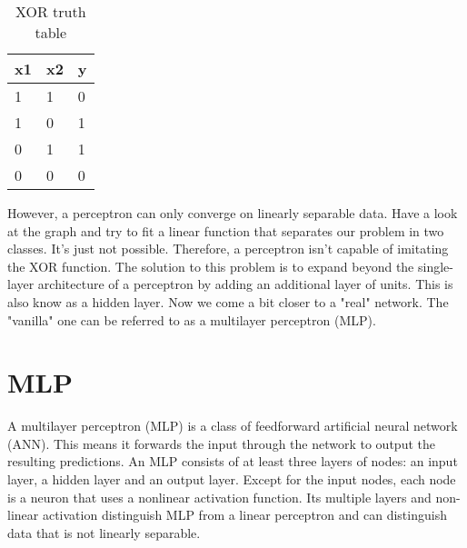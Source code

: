 %
\vspace{0.5cm}
\begin{table}[h!]
	\begin{center}
		\small\sffamily\renewcommand{\arraystretch}{0.9}
		\begin{tabular}{p{0.5cm}p{0.5cm}p{0.5cm}}
			x1 & x2 & y \\
			\midrule
			1 & 1 & 0 \\
			1 & 0 & 1 \\
			0 & 1 & 1 \\
			0 & 0 & 0 \\
		\end{tabular}
	\end{center}
	\caption[XOR truth table]{XOR truth table}
	\label{tab:event3}
\end{table}

However, a perceptron can only converge on linearly separable data. Have a look at the graph and try to fit a linear function that separates our problem in two classes. It's just not possible. Therefore, a perceptron isn’t capable of imitating the XOR function. The solution to this problem is to expand beyond the single-layer architecture of a perceptron by adding an additional layer of units. This is also know as a hidden layer. Now we come a bit closer to a "real" network. The "vanilla" one can be referred to as a multilayer perceptron (MLP).
%
%
\section{MLP}	
%
%
A multilayer perceptron (MLP) is a class of feedforward artificial neural network (ANN). This means it forwards the input through the network to output the resulting predictions. An MLP consists of at least three layers of nodes: an input layer, a hidden layer and an output layer. Except for the input nodes, each node is a neuron that uses a nonlinear activation function. Its multiple layers and non-linear activation distinguish MLP from a linear perceptron and can distinguish data that is not linearly separable.
\clearpage

